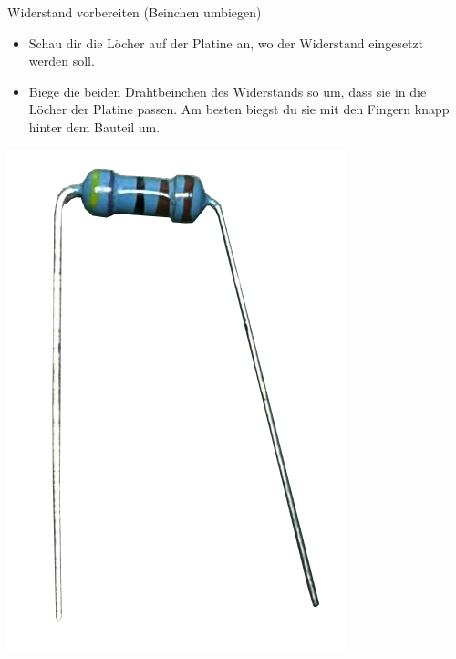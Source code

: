 \documentclass[10pt]{article}
\begin{document}
	\begin{itemize}
		
		\begin{minipage}{0.9\textwidth}
			
			\item Widerstand vorbereiten (Beinchen umbiegen)
			\begin{itemize}
				\item Schau dir die Löcher auf der Platine an, wo der Widerstand eingesetzt werden soll.
				\item Biege die beiden Drahtbeinchen des Widerstands so um, dass sie in die Löcher der Platine passen. Am besten biegst du sie mit den Fingern knapp hinter dem Bauteil um.
			\end{itemize}
		\end{minipage}
		\begin{minipage}{0.08\textwidth}\raggedleft
			\includegraphics[width=\linewidth]{resistor-bend.png}

\end{minipage}
\end{itemize}
\end{document}
